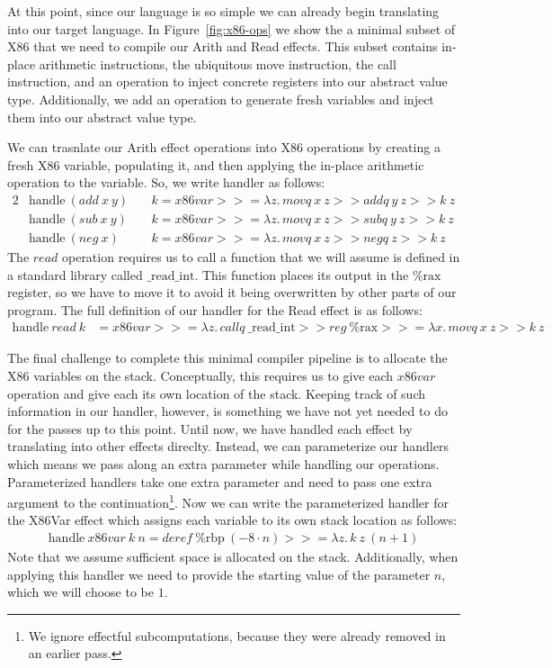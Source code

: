\documentclass[a4paper,UKenglish,cleveref, autoref, thm-restate, anonymous]{oasics-v2021}
\newcommand\bind[1]{>\!\!>\!\!= \lambda #1.\,}
\newcommand\then{>\!\!>}
\begin{document}
At this point, since our language is so simple we can already begin translating into our target language.
In Figure~\ref{fig:x86-ops} we show the a minimal subset of X86 that we need to compile our Arith and Read effects.
This subset contains in-place arithmetic instructions, the ubiquitous move instruction, the call instruction, and an operation to inject concrete registers into our abstract value type.
Additionally, we add an operation to generate fresh variables and inject them into our abstract value type.

We can trasnlate our Arith effect operations into X86 operations by creating a fresh X86 variable, populating it, and then applying the in-place arithmetic operation to the variable.
So, we write handler as follows:
\begin{alignat*}{2}
  & \mathrm{handle}~(\mathit{add}~x~y) &&~k = \mathit{x86var} \bind{z} \mathit{movq}~x~z \then \mathit{addq}~y~z \then k~z \\
  & \mathrm{handle}~(\mathit{sub}~x~y) &&~k = \mathit{x86var} \bind{z} \mathit{movq}~x~z \then \mathit{subq}~y~z \then k~z \\
  & \mathrm{handle}~(\mathit{neg}~x) &&~k = \mathit{x86var} \bind{z} \mathit{movq}~x~z \then \mathit{negq}~z \then k~z
\end{alignat*}
The $\mathit{read}$ operation requires us to call a function that we will assume is defined in a standard library called $\mathrm{\_read\_int}$. This function places its output in the $\mathrm{\%rax}$ register, so we have to move it to avoid it being overwritten by other parts of our program.
The full definition of our handler for the Read effect is as follows:
\begin{align*}
  \mathrm{handle}~\mathit{read}~k & = \mathit{x86var} \bind{z} \mathit{callq}~\mathrm{\_read\_int} \then \mathit{reg}~\mathrm{\%rax} \bind{x} \mathit{movq}~x~z \then k~z
\end{align*}

The final challenge to complete this minimal compiler pipeline is to allocate the X86 variables on the stack.
Conceptually, this requires us to give each $\mathit{x86var}$ operation and give each its own location of the stack.
Keeping track of such information in our handler, however, is something we have not yet needed to do for the passes up to this point.
Until now, we have handled each effect by translating into other effects direclty.
Instead, we can parameterize our handlers which means we pass along an extra parameter while handling our operations.
Parameterized handlers take one extra parameter and need to pass one extra argument to the continuation\footnote{We ignore effectful subcomputations, because they were already removed in an earlier pass.}. 
Now we can write the parameterized handler for the X86Var effect which assigns each variable to its own stack location as follows:
\begin{align*}
  \mathrm{handle}~\mathit{x86var}~k~n = \mathit{deref}~\mathrm{\%rbp}~(-8 \cdot n) \bind{z} k~z~(n + 1)
\end{align*}
Note that we assume sufficient space is allocated on the stack.
Additionally, when applying this handler we need to provide the starting value of the parameter $n$, which we will choose to be $1$.
\end{document}
